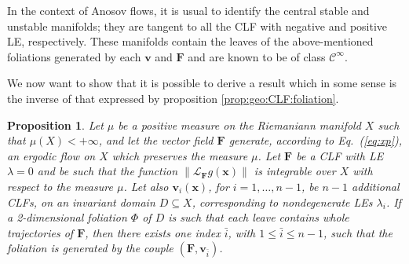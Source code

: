 \documentclass{article}
\theoremstyle{plain}
\newtheorem{proposition}[theorem]{Proposition}
\theoremstyle{definition}
\theoremstyle{remark}
\newcommand{\vect}[1]{\boldsymbol{#1}}
\begin{document}
In the context of Anosov flows, \cite{benoist1992} it is usual to
identify the central stable and unstable manifolds; they are tangent
to all the CLF with negative and positive LE, respectively.  These
manifolds contain the leaves of the above-mentioned foliations
generated by each $\vect{v}$ and $\vect{F}$ and are known to be
of class $\mathcal{C}^{\infty}$.

We now want to show that it is possible to derive a result which
in some sense is the inverse of
that expressed by proposition \ref{prop:geo:CLF:foliation}. 

\begin{proposition} \label{prop:geo:foliation:CLF}
Let $\mu$ be a positive measure on the Riemaniann manifold $X$
such that $\mu(X)<+\infty$, and
let the vector field $\vect{F}$ generate, according to Eq.~(\ref{eq:xp}), 
an ergodic flow on $X$ which preserves the measure $\mu$.
Let $\vect{F}$ be a CLF with LE $\lambda=0$ and be such that
the function $\lVert\mathcal{L}_{\vect{F}} g(\vect{x})\rVert$
is integrable over $X$ with respect to the measure $\mu$.
Let also
  $\vect{v}_i(\vect{x})$, for $i=1, \dots, n-1$, 
be $n-1$ additional CLFs, on an invariant domain
  $D\subseteq X$, corresponding to nondegenerate LEs $\lambda_i$.
  If a 2-dimensional foliation $\Phi$ of $D$ is such that each leave contains whole
  trajectories of $\vect{F}$, then there exists one index $\bar i$,
with $1\leq \bar i\leq n-1$, such that the foliation is generated by 
the couple $(\vect{F},\vect{v}_{\bar i})$.
\end{proposition}
\end{document}
